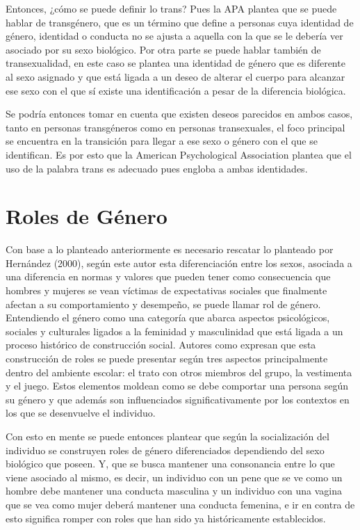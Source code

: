 Entonces, ¿cómo se puede definir lo trans? Pues la APA \parencite{APA} plantea
que se puede hablar de transgénero, que es un término que define a personas cuya
identidad de género, identidad o conducta no se ajusta a aquella con la que se
le debería ver asociado por su sexo biológico. Por otra parte se puede hablar
también de transexualidad, en este caso se plantea una identidad de género que
es diferente al sexo asignado y que está ligada a un deseo de alterar el cuerpo
para alcanzar ese sexo con el que sí existe una identificación a pesar de la
diferencia biológica.

Se podría entonces tomar en cuenta que existen deseos parecidos en ambos casos,
tanto en personas transgéneros como en personas transexuales, el foco principal
se encuentra en la transición para llegar a ese sexo o género con el que se
identifican. Es por esto que la American Psychological Association plantea que
el uso de la palabra trans es adecuado pues engloba a ambas identidades.


\section{Roles de Género}

Con base a lo planteado anteriormente es necesario rescatar lo planteado por
Hernández (2000), según
este autor esta diferenciación entre los sexos, asociada a una diferencia
en normas y valores que pueden tener como consecuencia que
hombres y mujeres se vean víctimas de expectativas sociales que finalmente
afectan a su comportamiento y desempeño, se puede llamar rol de género.
Entendiendo el género como una categoría que abarca aspectos psicológicos,
sociales y culturales ligados a la feminidad y masculinidad que está ligada a
un proceso histórico de construcción social.  Autores como
\textcite{Gonzalez2013} expresan que esta construcción de roles se puede
presentar según tres aspectos principalmente dentro del ambiente escolar: el
trato con otros miembros del grupo, la vestimenta y el juego. Estos elementos
moldean como se debe comportar una persona según su género y que además son
influenciados significativamente por los contextos en los que se desenvuelve el
individuo.

Con esto en mente se puede entonces plantear que según la socialización del
individuo se construyen roles de género diferenciados dependiendo del sexo biológico que
poseen. Y, que se busca mantener una consonancia entre lo que viene asociado al
mismo, es decir, un individuo con un pene que se ve como un hombre debe mantener
una conducta masculina y un individuo con una vagina que se vea como mujer
deberá mantener una conducta femenina, e ir en contra de esto significa romper
con roles que han sido ya históricamente establecidos.

